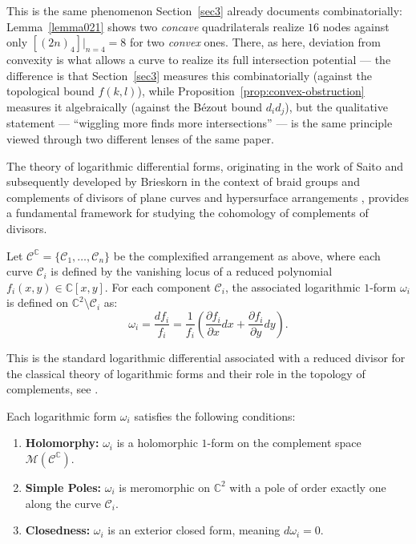 \documentclass[article,11pt]{amsart} \numberwithin{equation}{section}
\numberwithin{equation}{section}
\begin{document}
{\begin{rk}
	\label{rem:section3-echo}
	This is the same phenomenon Section~\ref{sec3} already documents combinatorially:
	Lemma~\ref{lemma021} shows two \emph{concave} quadrilaterals realize $16$ nodes
	against only $[(2n)_4]|_{n=4}=8$ for two \emph{convex} ones. There, as
	here, deviation from convexity is what allows a curve to realize its full
	intersection potential --- the difference is that Section~\ref{sec3} measures this
	combinatorially (against the topological bound $f(k,l)$), while
	Proposition~\ref{prop:convex-obstruction} measures it algebraically
	(against the Bézout bound $d_id_j$), but the qualitative statement ---
	``wiggling more finds more intersections'' --- is the same principle
	viewed through two different lenses of the same paper.
\end{rk}


The theory of logarithmic differential forms, originating in the work of Saito \cite{Saito80} and subsequently developed by Brieskorn \cite{Brieskorn1973} in the context of braid groups and complements of divisors of plane curves and hypersurface arrangements
\cite{OrlikTerao,Dupont2015,CogolludoMatei2012},
provides a fundamental framework for studying the cohomology of complements of divisors.

\begin{df}\label{loga:form}
	Let $\mathcal{C}^\mathbb{C} = \{\mathscr{C}_1, \dots, \mathscr{C}_n\}$ be the complexified arrangement as above, where each curve $\mathscr{C}_i$ is defined by the vanishing locus of a reduced polynomial $f_i(x,y) \in \mathbb{C}[x,y]$. For each component $\mathscr{C}_i$, the associated logarithmic $1$-form $\omega_i$ is defined on $\mathbb{C}^2 \setminus \mathscr{C}_i$ as:
	\[ \omega_i = \frac{df_i}{f_i} = \frac{1}{f_i} \left( \frac{\partial f_i}{\partial x} dx + \frac{\partial f_i}{\partial y} dy \right). \]
\end{df}

This is the standard logarithmic differential associated with a reduced divisor for the classical theory of logarithmic forms and their role in the topology of complements, see \cite{Saito80,Brieskorn1973,Dupont2015}.

\begin{lm}\label{lm:df}
	Each logarithmic form $\omega_i$ satisfies the following conditions:
	\begin{enumerate}
		\item[\rm (i)] \textbf{Holomorphy:} $\omega_i$ is a holomorphic $1$-form on the complement space $\mathcal{M}(\mathcal{C}^\mathbb{C})$.
		\item[\rm (ii)] \textbf{Simple Poles:} $\omega_i$ is meromorphic on $\mathbb{C}^2$ with a pole of order exactly one along the curve $\mathscr{C}_i$.
		\item[\rm (iii)] \textbf{Closedness:} $\omega_i$ is an exterior closed form, meaning $d\omega_i = 0$.
	\end{enumerate}
\end{lm}

}
\end{document}
